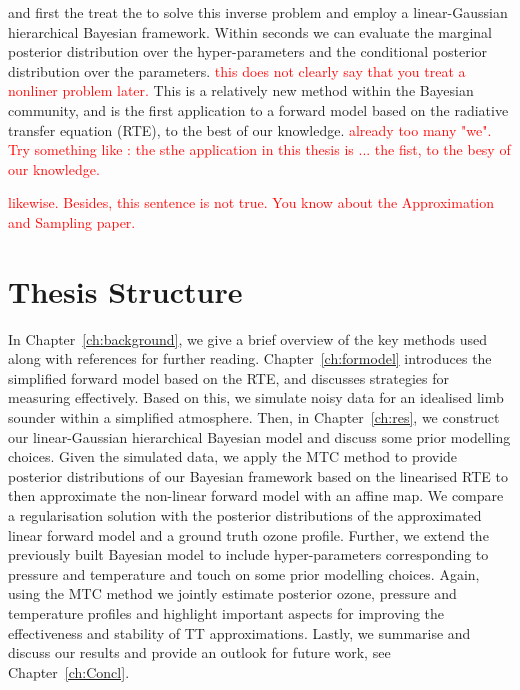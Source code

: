and first the treat the 
to solve this inverse problem and employ a linear-Gaussian hierarchical Bayesian framework.
Within seconds we can evaluate the marginal posterior distribution over the hyper-parameters and the conditional posterior distribution over the parameters. \textcolor{red}{this does not clearly say that you treat a nonliner problem later.}
This is a relatively new method within the Bayesian community, and is the first application to a forward model based on the radiative transfer equation (RTE), to the best of our knowledge. \textcolor{red}{already too many "we". Try something like : the sthe application in this thesis is ... the fist, to the besy of our knowledge.}

\textcolor{red}{likewise. Besides, this sentence is not true. You know about the Approximation and Sampling paper.}
\section{Thesis Structure}
In Chapter~\ref{ch:background}, we give a brief overview of the key methods used along with references for further reading.
Chapter~\ref{ch:formodel} introduces the simplified forward model based on the RTE, and discusses strategies for measuring effectively.
Based on this, we simulate noisy data for an idealised limb sounder within a simplified atmosphere.
Then, in Chapter~\ref{ch:res}, we construct our linear-Gaussian hierarchical Bayesian model and discuss some prior modelling choices.
Given the simulated data, we apply the MTC method to provide posterior distributions of our Bayesian framework based on the linearised RTE to then approximate the non-linear forward model with an affine map. 
We compare a regularisation solution with the posterior distributions of the approximated linear forward model and a ground truth ozone profile.
Further, we extend the previously built Bayesian model to include hyper-parameters corresponding to pressure and temperature and touch on some prior modelling choices. 
Again, using the MTC method we jointly estimate posterior ozone, pressure and temperature profiles and highlight important aspects for improving the effectiveness and stability of TT approximations.
Lastly, we summarise and discuss our results and provide an outlook for future work, see Chapter~\ref{ch:Concl}.

